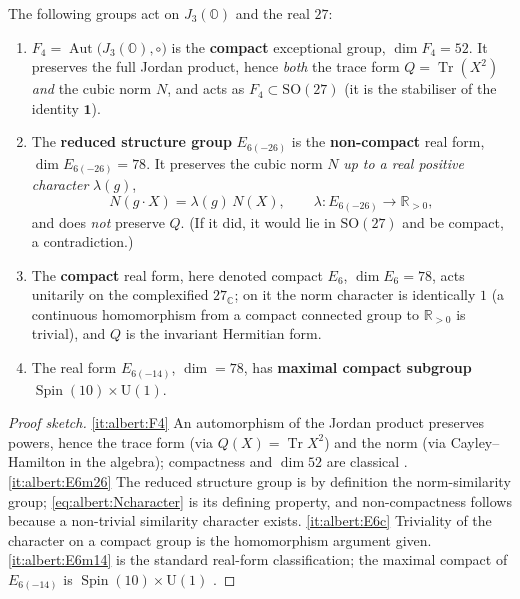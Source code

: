 \begin{theorem}\label{thm:albert:fourforms}
The following groups act on $J_{3}(\mathbb{O})$ and the real $27$:
\begin{enumerate}
\item\label{it:albert:F4}
  $F_{4}=\operatorname{Aut}\bigl(J_{3}(\mathbb{O}),\circ\bigr)$ is the
  \textbf{compact} exceptional group, $\dim F_{4}=52$. It preserves the
  full Jordan product, hence \emph{both} the trace form
  $Q=\operatorname{Tr}(X^{2})$ \emph{and} the cubic norm $N$, and acts as
  $F_{4}\subset\mathrm{SO}(27)$ (it is the stabiliser of the identity
  $\mathbf 1$).
\item\label{it:albert:E6m26}
  The \textbf{reduced structure group}
  $E_{6(-26)}$ is the \textbf{non-compact} real form,
  $\dim E_{6(-26)}=78$. It preserves the cubic norm $N$ \emph{up to a
  real positive character} $\lambda(g)$,
  \begin{equation}\label{eq:albert:Ncharacter}
    N(g\cdot X)=\lambda(g)\,N(X),\qquad \lambda:E_{6(-26)}\to\mathbb{R}_{>0},
  \end{equation}
  and does \emph{not} preserve $Q$. (If it did, it would lie in
  $\mathrm{SO}(27)$ and be compact, a contradiction.)
\item\label{it:albert:E6c}
  The \textbf{compact} real form, here denoted compact $E_{6}$,
  $\dim E_{6}=78$, acts unitarily on the complexified $27_{\mathbb{C}}$;
  on it the norm character is identically $1$ (a continuous homomorphism
  from a compact connected group to $\mathbb{R}_{>0}$ is trivial), and
  $Q$ is the invariant Hermitian form.
\item\label{it:albert:E6m14}
  The real form $E_{6(-14)}$, $\dim=78$, has \textbf{maximal compact
  subgroup} $\operatorname{Spin}(10)\times\mathrm{U}(1)$.
\end{enumerate}
\end{theorem}

\begin{proof}[Proof sketch]
\ref{it:albert:F4} An automorphism of the Jordan product preserves
powers, hence the trace form (via $Q(X)=\operatorname{Tr}X^{2}$) and the
norm (via Cayley--Hamilton in the algebra); compactness and $\dim 52$ are
classical \cite{Springer:2000}. \ref{it:albert:E6m26} The reduced
structure group is by definition the norm-similarity group;
\eqref{eq:albert:Ncharacter} is its defining property, and non-compactness
follows because a non-trivial similarity character exists. \ref{it:albert:E6c}
Triviality of the character on a compact group is the homomorphism
argument given. \ref{it:albert:E6m14} is the standard real-form
classification; the maximal compact of $E_{6(-14)}$ is
$\operatorname{Spin}(10)\times\mathrm{U}(1)$
\cite{Springer:2000,Slansky:1981,Helgason:1978}.
\end{proof}

